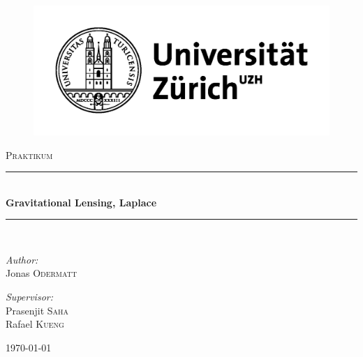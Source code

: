 \documentclass[pdftex,12pt,a4paper]{article}
\newcommand{\HRule}{\rule{\linewidth}{0.5mm}}
\begin{document}
\begin{titlepage}
\begin{center}


\begin{figure}[position=h]
\centering
 \includegraphics[width=12.5cm]{Bilder/uzhlog}%
\end{figure}



\textsc{\Large Praktikum}\\[0.5cm]

\HRule \\[0.4cm]
{ \huge \bfseries Gravitational Lensing, Laplace}\\[0.4cm]

\HRule \\[1.5cm]

\begin{minipage}{0.4\textwidth}
\begin{flushleft} \large
\emph{Author:}\\
Jonas \textsc{Odermatt}
\end{flushleft}
\end{minipage}
\begin{minipage}{0.4\textwidth}
\begin{flushright} \large
\emph{Supervisor:} \\
Prasenjit \textsc{Saha} \\ Rafael \textsc{Kueng}
\end{flushright}
\end{minipage}

\vfill

{\large \today}

\end{center}
\end{titlepage}
\end{document}
